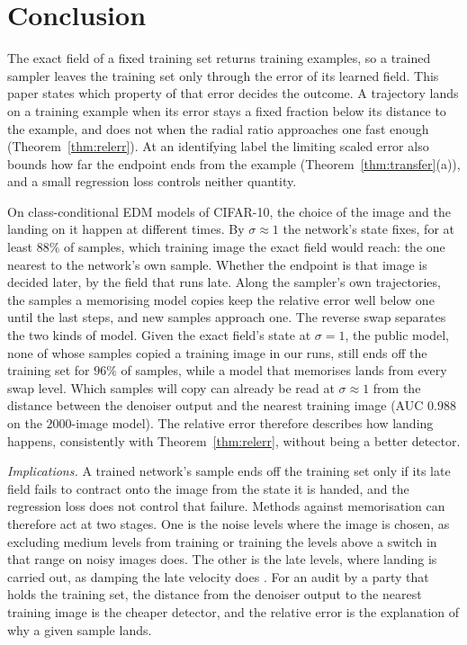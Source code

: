 \documentclass{article} %
\theoremstyle{plain}
\theoremstyle{definition}
\theoremstyle{remark}
\begin{document}
\section{Conclusion}
\label{sec:conclusion}

The exact field of a fixed training set returns training examples, so a trained sampler leaves
the training set only through the error of its learned field. This paper states which property of
that error decides the outcome. A trajectory lands on a training example when its error stays a
fixed fraction below its distance to the example, and does not when the radial ratio approaches one
fast enough (Theorem~\ref{thm:relerr}). At an identifying label the limiting scaled error also
bounds how far the endpoint ends from the example (Theorem~\ref{thm:transfer}(a)), and a small regression
loss controls neither quantity.

On class-conditional EDM models of CIFAR-10, the choice of the image and the landing on it happen at
different times. By $\sigma\approx1$ the network's state fixes, for at least $88\%$ of samples, which
training image the exact field would reach: the one nearest to the network's own sample. Whether
the endpoint is that image is decided later, by the field that runs late. Along the sampler's own
trajectories, the samples a memorising model copies keep the relative error well below one until
the last steps, and new samples approach one. The reverse swap separates the two kinds of model.
Given the exact field's state at $\sigma=1$, the public model, none of whose samples copied a training image in our runs, still ends off
the training set for $96\%$ of samples, while a model that memorises lands from every swap level.
Which samples will copy can already be read at $\sigma\approx1$ from the distance between the
denoiser output and the nearest training image (AUC $0.988$ on the $2000$-image model). The
relative error therefore describes how landing happens, consistently with
Theorem~\ref{thm:relerr}, without being a better detector.

\emph{Implications.} A trained network's sample ends off the training set only if its late field
fails to contract onto the image from the state it is handed, and the regression loss does not
control that failure. Methods against memorisation can therefore act at two stages. One is the noise
levels where the image is chosen, as excluding medium levels from training \citep{dodson2026calm} or
training the levels above a switch in that range on noisy images \citep{shah2025ambient} does. The
other is the late levels, where landing is carried out, as damping the late velocity does
\citep{li2026kinetic}. For an audit by a party that holds the training set, the distance from the
denoiser output to the nearest training image is the cheaper detector, and the relative error is the
explanation of why a given sample lands.
\end{document}

